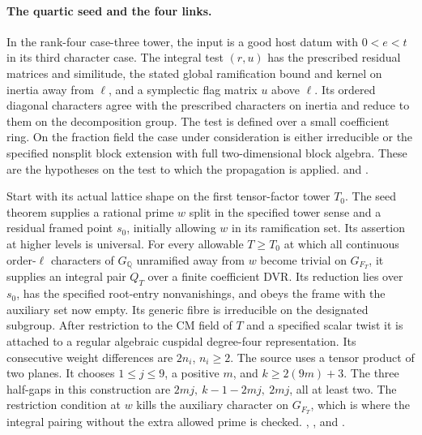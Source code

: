 \paragraph{The quartic seed and the four links.}
In the rank-four case-three tower, the input is a good host datum
with \(0<e<t\) in its third character case. The integral test
\((r,u)\) has the prescribed residual matrices and similitude,
the stated global ramification bound and kernel on inertia away
from \(\ell\), and a symplectic flag matrix \(u\) above \(\ell\).
Its ordered diagonal characters agree with the prescribed
characters on inertia and reduce to them on the decomposition
group. The test is defined over a small coefficient ring.
On the fraction field the case under consideration is either
irreducible or the specified nonsplit block extension with full
two-dimensional block algebra. These are the hypotheses on the
test to which the propagation is applied.
and .

Start with its actual lattice shape on the first tensor-factor tower \(T_0\).
The seed theorem supplies a rational prime \(w\) split in the
specified tower sense and a residual framed point \(s_0\), initially
allowing \(w\) in its ramification set. Its assertion at higher
levels is universal. For every allowable \(T\ge T_0\) at which
all continuous order-\(\ell\) characters of \(G_{\mathbb Q}\)
unramified away from \(w\) become trivial on \(G_{F_T}\), it
supplies an integral pair \(Q_T\) over a finite coefficient DVR.
Its reduction lies over \(s_0\), has the specified root-entry
nonvanishings, and obeys the frame with the auxiliary set now empty.
Its generic fibre is irreducible on the designated subgroup.
After restriction to the CM field of \(T\) and a specified scalar
twist it is attached to a regular algebraic cuspidal degree-four
representation. Its consecutive weight differences are \(2n_i\),
\(n_i\ge2\). The source uses a tensor product of two planes. It
chooses \(1\le j\le9\), a positive \(m\), and \(k\ge2(9m)+3\).
The three half-gaps in this construction are
\(2mj,\ k-1-2mj,\ 2mj\), all at least two. The restriction
condition at \(w\) kills the auxiliary character on \(G_{F_T}\),
which is where the integral pairing without the extra allowed prime
is checked.
,
,
and .

